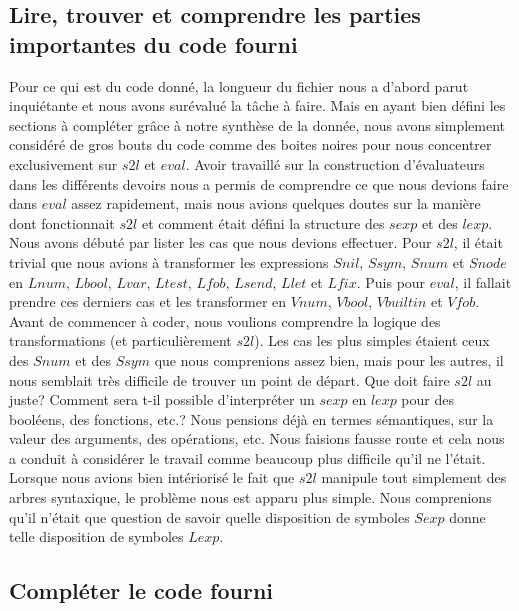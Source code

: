 \documentclass{article}
\begin{document}
	\subsection{Lire, trouver et comprendre les parties importantes du code fourni}

	Pour ce qui est du code donné, la longueur du fichier nous a d'abord parut
	inquiétante et nous avons surévalué la tâche à faire. Mais en ayant bien défini
	les sections à compléter grâce à notre synthèse de la donnée, nous avons
	simplement considéré de gros bouts du code comme des boites noires pour nous
	concentrer exclusivement sur $s2l$ et $eval$. Avoir travaillé sur
	la construction d'évaluateurs dans les différents devoirs nous a permis de comprendre
	ce que nous devions faire dans $eval$ assez rapidement, mais nous avions
	quelques doutes sur la manière dont fonctionnait $s2l$ et comment était défini
	la structure des $sexp$ et des $lexp$. Nous avons débuté par lister les cas que
	nous devions effectuer. Pour $s2l$, il était trivial que nous avions à transformer
	les expressions $Snil$, $Ss ym$, $Snum$ et $Snode$ en $Lnum$, $Lbool$, $Lvar$,
	$Ltest$, $Lfob$, $Lsend$, $Llet$ et $Lfix$. Puis pour $eval$, il fallait prendre
	ces derniers cas et les transformer en $Vnum$, $Vbool$, $Vbuiltin$ et $Vfob$.
	Avant de commencer à coder, nous voulions comprendre la logique des transformations
	(et particulièrement $s2l$). Les cas les plus simples étaient ceux des $Snum$ et
	des $Ssym$ que nous comprenions assez bien, mais pour les autres, il nous
	semblait très difficile de trouver un point de départ. Que doit faire $s2l$ au
	juste? Comment sera t-il possible d'interpréter un $sexp$ en $lexp$ pour des
	booléens, des fonctions, etc.? Nous pensions déjà en termes sémantiques, sur la
	valeur des arguments, des opérations, etc. Nous faisions fausse route et cela
	nous a conduit à considérer le travail comme beaucoup plus difficile qu'il ne
	l'était. Lorsque nous avions bien intériorisé le fait que $s2l$ manipule tout simplement
	des arbres syntaxique, le problème nous est apparu plus simple. Nous comprenions
	qu'il n'était que question de savoir quelle disposition de symboles $Sexp$ donne telle
	disposition de symboles $Lexp$.

	\subsection{Compléter le code fourni}
\end{document}
